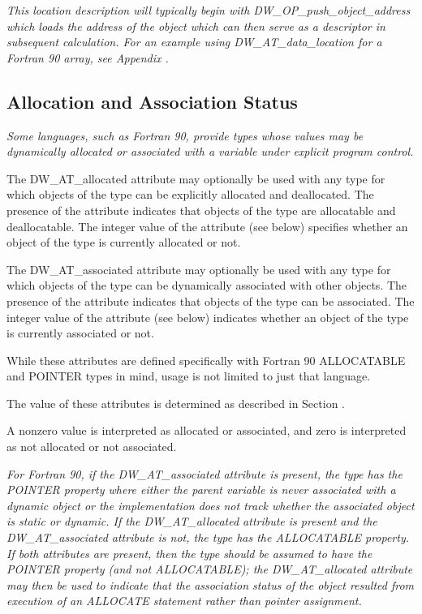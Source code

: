 \textit{This location description will typically begin with
DW\_OP\_push\_object\_address which loads the address of the
object which can then serve as a descriptor in subsequent
calculation. For an example using DW\_AT\_data\_location for a
Fortran 90 array, see 
Appendix .}

\subsection{Allocation and Association Status}
\label{chap:allocationandassociationstatus}

\textit{Some languages, such as Fortran 90, provide types whose values
may be dynamically allocated or associated with a variable
under explicit program control.}

The DW\_AT\_allocated attribute may optionally be used with any
type for which objects of the type can be explicitly allocated
and deallocated. The presence of the attribute indicates that
objects of the type are allocatable and deallocatable. The
integer value of the attribute (see below) specifies whether
an object of the type is currently allocated or not.

The DW\_AT\_associated attribute may optionally be used with
any type for which objects of the type can be dynamically
associated with other objects. The presence of the attribute
indicates that objects of the type can be associated. The
integer value of the attribute (see below) indicates whether
an object of the type is currently associated or not.

While these attributes are defined specifically with Fortran
90 ALLOCATABLE and POINTER types in mind, usage is not limited
to just that language.

The value of these attributes is determined as described in
Section .

A non\dash zero value is interpreted as allocated or associated,
and zero is interpreted as not allocated or not associated.

\textit{For Fortran 90, if the DW\_AT\_associated attribute is present,
the type has the POINTER property where either the parent
variable is never associated with a dynamic object or the
implementation does not track whether the associated object
is static or dynamic. If the DW\_AT\_allocated attribute is
present and the DW\_AT\_associated attribute is not, the type
has the ALLOCATABLE property. If both attributes are present,
then the type should be assumed to have the POINTER property
(and not ALLOCATABLE); the DW\_AT\_allocated attribute may then
be used to indicate that the association status of the object
resulted from execution of an ALLOCATE statement rather than
pointer assignment.}

